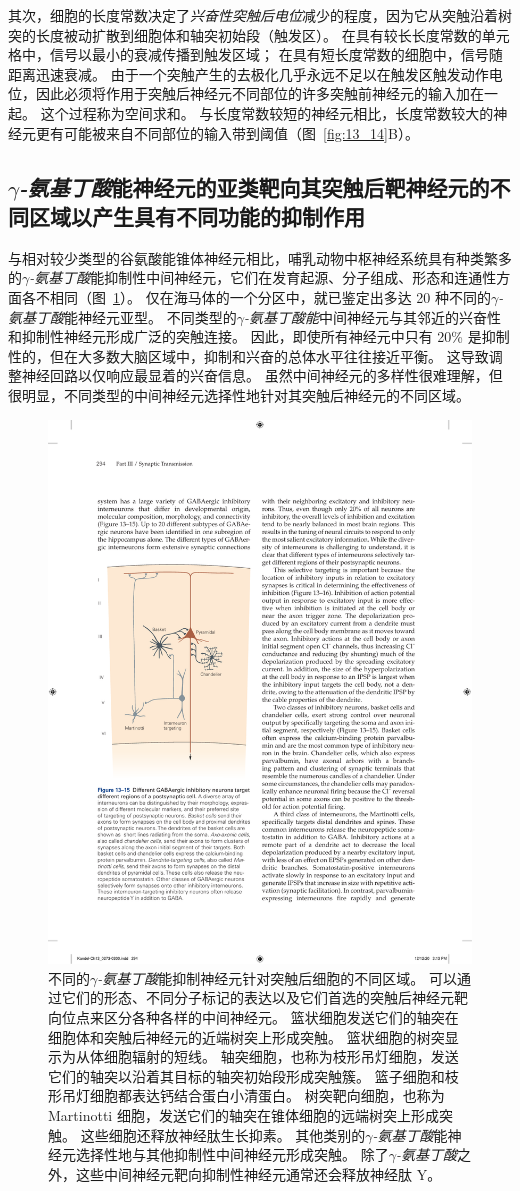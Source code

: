 其次，细胞的长度常数决定了\textit{兴奋性突触后电位}减少的程度，因为它从突触沿着树突的长度被动扩散到细胞体和轴突初始段（触发区）。
在具有较长长度常数的单元格中，信号以最小的衰减传播到触发区域；
在具有短长度常数的细胞中，信号随距离迅速衰减。
由于一个突触产生的去极化几乎永远不足以在触发区触发动作电位，因此必须将作用于突触后神经元不同部位的许多突触前神经元的输入加在一起。
这个过程称为空间求和。
与长度常数较短的神经元相比，长度常数较大的神经元更有可能被来自不同部位的输入带到阈值（图~\ref{fig:13_14}B）。



\subsection{\textit{$\gamma$-氨基丁酸}能神经元的亚类靶向其突触后靶神经元的不同区域以产生具有不同功能的抑制作用}

与相对较少类型的谷氨酸能锥体神经元相比，哺乳动物中枢神经系统具有种类繁多的\textit{$\gamma$-氨基丁酸}能抑制性中间神经元，它们在发育起源、分子组成、形态和连通性方面各不相同（图~\ref{fig:13_15}）。
仅在海马体的一个分区中，就已鉴定出多达 20 种不同的\textit{$\gamma$-氨基丁酸}能神经元亚型。
不同类型的\textit{$\gamma$-氨基丁酸能}中间神经元与其邻近的兴奋性和抑制性神经元形成广泛的突触连接。
因此，即使所有神经元中只有 20\% 是抑制性的，但在大多数大脑区域中，抑制和兴奋的总体水平往往接近平衡。
这导致调整神经回路以仅响应最显着的兴奋信息。
虽然中间神经元的多样性很难理解，但很明显，不同类型的中间神经元选择性地针对其突触后神经元的不同区域。


\begin{figure}[htbp]
	\centering
	\includegraphics[width=0.5\linewidth]{chap13/fig_13_15}
	\caption{不同的\textit{$\gamma$-氨基丁酸}能抑制神经元针对突触后细胞的不同区域。
		可以通过它们的形态、不同分子标记的表达以及它们首选的突触后神经元靶向位点来区分各种各样的中间神经元。
		篮状细胞发送它们的轴突在细胞体和突触后神经元的近端树突上形成突触。
		篮状细胞的树突显示为从体细胞辐射的短线。
		轴突细胞，也称为枝形吊灯细胞，发送它们的轴突以沿着其目标的轴突初始段形成突触簇。
		篮子细胞和枝形吊灯细胞都表达钙结合蛋白小清蛋白。
		树突靶向细胞，也称为 Martinotti 细胞，发送它们的轴突在锥体细胞的远端树突上形成突触。
		这些细胞还释放神经肽生长抑素。
		其他类别的\textit{$\gamma$-氨基丁酸}能神经元选择性地与其他抑制性中间神经元形成突触。
		除了\textit{$\gamma$-氨基丁酸}之外，这些中间神经元靶向抑制性神经元通常还会释放神经肽 Y。}
	\label{fig:13_15}
\end{figure}


